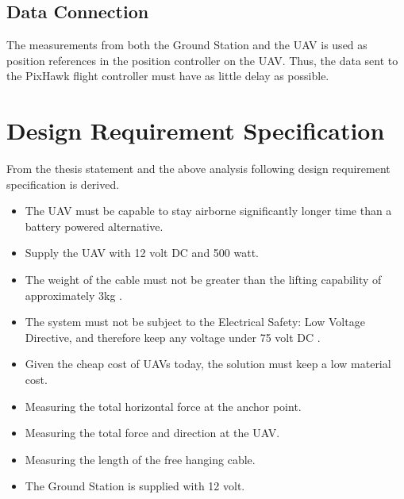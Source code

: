 \subsection{Data Connection}
The measurements from both the Ground Station and the UAV is used as position references in the position controller on the UAV. Thus, the data sent to the PixHawk flight controller must have as little delay as possible.

\newpage
\section{Design Requirement Specification}
From the thesis statement and the above analysis following design requirement specification is derived.

\begin{itemize}
\item The UAV must be capable to stay airborne significantly longer time than a battery powered alternative.
\item Supply the UAV with 12 volt DC and 500 watt.
\item The weight of the cable must not be greater than the lifting capability of approximately 3kg \cite{Sidea2013}.
\item The system must not be subject to the Electrical Safety: Low Voltage Directive, and therefore keep any voltage under 75 volt DC \cite{Parliament2006}.
\item Given the cheap cost of UAVs today, the solution must keep a low material cost.
\item Measuring the total horizontal force at the anchor point.
\item Measuring the total force and direction at the UAV.
\item Measuring the length of the free hanging cable.
\item The Ground Station is supplied with 12 volt.
\end{itemize}





